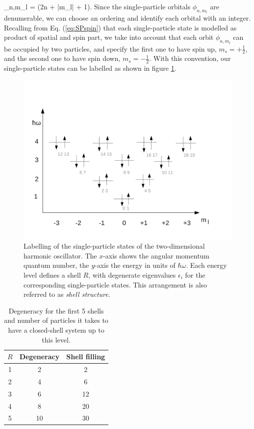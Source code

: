 \be 
\epsilon_{n,m_l} = \hbar\omega(2n + |m_l| + 1).
\label{eq:emn}
\ee
Since the single-particle orbitals $\phi_{n,m_l}$ are denumerable, we can choose an ordering and identify each orbital with an integer. Recalling from Eq. (\ref{eq:SPspin}) that each single-particle state is modelled as product of spatial and spin part, we take into account that each orbit $\phi_{n,m_l}$ can be occupied by two particles, and specify the first one to have spin up, $m_s = +\frac{1}{2}$, and the second one to have spin down, $m_s = -\frac{1}{2}$. With this convention, our single-particle states can be labelled as shown in figure \ref{fig:shellstructure}.

\begin{figure}
\begin{center}
\includegraphics[scale=0.5]{../Plots/shellstructure1.pdf}
\end{center}
\caption{Labelling of the single-particle states of the two-dimensional harmonic oscillator. The $x$-axis shows the angular momentum quantum number, the $y$-axis the energy in units of $\hbar\omega$. Each energy level defines a shell $R$, with degenerate eigenvalues $\epsilon_i$ for the corresponding single-particle states. This arrangement is also referred to as \textit{shell structure}. }
\label{fig:shellstructure}
\end{figure}

\begin{table}
\begin{center}
\begin{tabular}[htb]{c c c}
\hline
$R$ & Degeneracy & Shell filling\\
\hline 
1 & 2 & 2 \\
2 & 4 & 6 \\
3 & 6 & 12 \\
4 & 8 & 20 \\
5 & 10 & 30 \\
\hline
\end{tabular}
\caption{Degeneracy for the first 5 shells and number of particles it takes to have a closed-shell system up to this level.}
\label{tab:shell}
\end{center}
\end{table}

